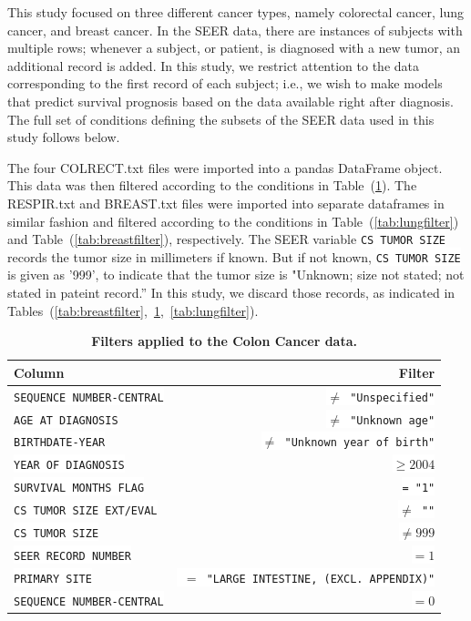 \documentclass[10pt,letterpaper]{article}
\newcommand{\codewhite}[1]{\colorbox{white}{\texttt{#1}}}
\begin{document}
This study focused on three different cancer types, namely colorectal cancer, lung cancer, and breast cancer. 
In the SEER data, there are instances of subjects with multiple rows; whenever a subject, or patient, is diagnosed with a new tumor, an additional record is added. In this study, we restrict attention to the data corresponding to the first record of each subject; i.e., we wish to make models that predict survival prognosis based on the data available right after diagnosis. The full set of conditions defining the subsets of the SEER data used in this study follows below.



 The four COLRECT.txt files were imported into a pandas DataFrame object.
This data was then filtered according to the conditions in Table~(\ref{tab:colonfilter}).
The RESPIR.txt and BREAST.txt files were imported into separate dataframes in similar fashion and filtered according
to the conditions in Table~(\ref{tab:lungfilter}) and Table~(\ref{tab:breastfilter}), respectively.
The SEER variable \codewhite{CS TUMOR SIZE} records the tumor size in millimeters if known. But if not known, \codewhite{CS TUMOR SIZE} is given as '999', to indicate that the tumor size is "Unknown; size not stated; not stated in pateint record.'' In this study, we discard those records, as indicated in Tables~(\ref{tab:breastfilter},~\ref{tab:colonfilter},~\ref{tab:lungfilter}).






\begin{table}[!ht]
\begin{adjustwidth}{-2.25in}{0in} %
\caption{\label{tab:colonfilter} {\bf Filters applied to the Colon Cancer data.}}
\begin{tabular}{lr}
\toprule
 Column &  Filter \\
\midrule
\codewhite{SEQUENCE NUMBER-CENTRAL} & \codewhite{$\neq$ "Unspecified"} \\
\codewhite{AGE AT DIAGNOSIS} & \codewhite{$\neq$ "Unknown age"} \\
\codewhite{BIRTHDATE-YEAR} & \codewhite{$\neq$ "Unknown year of birth"} \\
\codewhite{YEAR OF DIAGNOSIS} & \codewhite{$\geq 2004$} \\
\codewhite{SURVIVAL MONTHS FLAG} & \codewhite{= "1"}\\
\codewhite{CS TUMOR SIZE EXT/EVAL} & \codewhite{$\neq$ ""} \\
\codewhite{CS TUMOR SIZE} & \codewhite{$\neq 999$} \\
\codewhite{SEER RECORD NUMBER} & \codewhite{$= 1$} \\
\codewhite{PRIMARY SITE} & \codewhite{ $=$ "LARGE INTESTINE, (EXCL. APPENDIX)"} \\
\codewhite{SEQUENCE NUMBER-CENTRAL} & \codewhite{$=0$} \\
\bottomrule
\end{tabular}
\end{adjustwidth}
\end{table}
\end{document}
